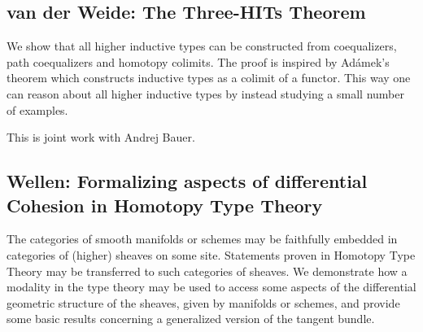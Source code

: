 \documentclass[a4paper,10pt]{scrartcl}
\begin{document}
\subsection*{van der Weide: The Three-HITs Theorem}

We show that all higher inductive types can be constructed from coequalizers, path coequalizers and homotopy colimits. The proof is inspired by Adámek's theorem which constructs inductive types as a colimit of a functor. This way one can reason about all higher inductive types by instead studying a small number of examples.

This is joint work with Andrej Bauer.

\subsection*{Wellen: Formalizing aspects of differential Cohesion in Homotopy Type Theory}

The categories of smooth manifolds or schemes may be faithfully embedded in categories of (higher) sheaves on some site. Statements proven in Homotopy Type Theory may be transferred to such categories of sheaves.
We demonstrate how a modality in the type theory may be used to access some aspects of the differential geometric structure of the sheaves, given by manifolds or schemes, and provide some basic results concerning a generalized version of the tangent bundle.
\end{document}
